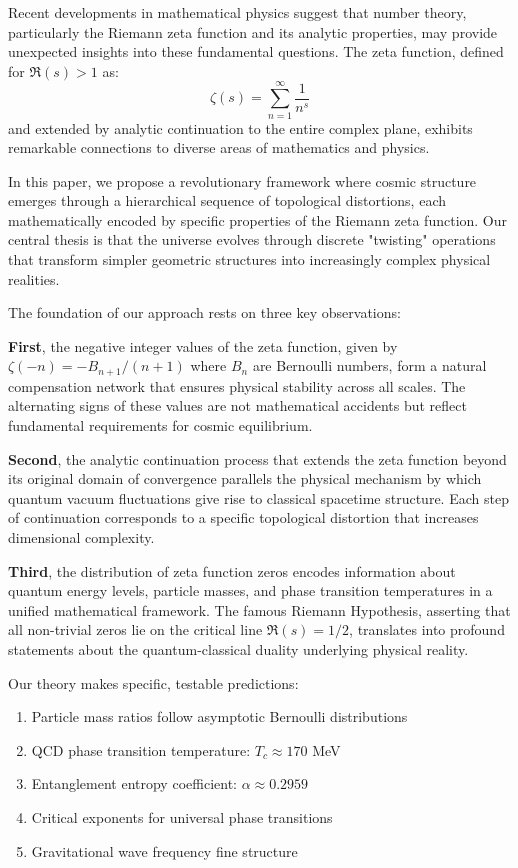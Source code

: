 \documentclass[11pt]{article}
\begin{document}
Recent developments in mathematical physics suggest that number theory, particularly the Riemann zeta function and its analytic properties, may provide unexpected insights into these fundamental questions. The zeta function, defined for $\Re(s) > 1$ as:
$$\zeta(s) = \sum_{n=1}^{\infty} \frac{1}{n^s}$$
and extended by analytic continuation to the entire complex plane, exhibits remarkable connections to diverse areas of mathematics and physics.

In this paper, we propose a revolutionary framework where cosmic structure emerges through a hierarchical sequence of topological distortions, each mathematically encoded by specific properties of the Riemann zeta function. Our central thesis is that the universe evolves through discrete "twisting" operations that transform simpler geometric structures into increasingly complex physical realities.

The foundation of our approach rests on three key observations:

\textbf{First}, the negative integer values of the zeta function, given by $\zeta(-n) = -B_{n+1}/(n+1)$ where $B_n$ are Bernoulli numbers, form a natural compensation network that ensures physical stability across all scales. The alternating signs of these values are not mathematical accidents but reflect fundamental requirements for cosmic equilibrium.

\textbf{Second}, the analytic continuation process that extends the zeta function beyond its original domain of convergence parallels the physical mechanism by which quantum vacuum fluctuations give rise to classical spacetime structure. Each step of continuation corresponds to a specific topological distortion that increases dimensional complexity.

\textbf{Third}, the distribution of zeta function zeros encodes information about quantum energy levels, particle masses, and phase transition temperatures in a unified mathematical framework. The famous Riemann Hypothesis, asserting that all non-trivial zeros lie on the critical line $\Re(s) = 1/2$, translates into profound statements about the quantum-classical duality underlying physical reality.

Our theory makes specific, testable predictions:
\begin{enumerate}
\item Particle mass ratios follow asymptotic Bernoulli distributions
\item QCD phase transition temperature: $T_c \approx 170$ MeV
\item Entanglement entropy coefficient: $\alpha \approx 0.2959$
\item Critical exponents for universal phase transitions
\item Gravitational wave frequency fine structure
\end{enumerate}
\end{document}
